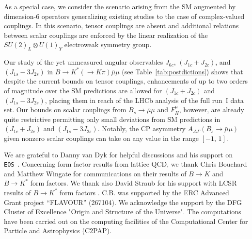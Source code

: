\documentclass[twocolumn,epjc3]{svjour3}
\numberwithin{equation}{section}
\def \reftab#1{Table~\ref{#1}}
\renewcommand{\[}{\big[}
\renewcommand{\]}{\big]}
\renewcommand{\(}{\big(}
\renewcommand{\)}{\big)}
\def \eos{\texttt{EOS}}
\begin{document}
As a special case, we consider the scenario arising from the SM
augmented by dimension-6 operators generalizing existing studies to
the case of complex-valued couplings. In this scenario, tensor
couplings are absent and additional relations between scalar couplings
are enforced by the linear realization of the $SU(2)_L \otimes U(1)_Y$
electroweak symmetry group.

Our study of the {yet unmeasured} angular observables $J_{6c}$,
$(J_{1c} + J_{2c})$, and $(J_{1s} - 3 J_{2s})$ in $B\to K^* (\to K\pi)
\bar\mu\mu$ (see \reftab{tab:postdictions}) shows that despite the
current bounds on tensor couplings, enhancements of up to two orders
of magnitude over the SM predictions are allowed for $(J_{1c} +
J_{2c})$ and $(J_{1s} - 3 J_{2s})$, placing them in reach of the LHCb
analysis of the full run~I data set. Our bounds on scalar couplings
from $B_s\to \bar\mu\mu$ and $F_H^\mu$, however, are already quite
restrictive permitting only small deviations from SM predictions in
$(J_{1c} + J_{2c})$ and $(J_{1s} - 3 J_{2s})$. Notably, the CP
asymmetry $A_{\Delta\Gamma}(B_s\to \bar\mu\mu)$ given nonzero scalar
couplings can take on any value in the range $[-1,\, 1]$.

%
%
%
\begin{acknowledgements}
  We are grateful to Danny van Dyk for helpful discussions and his support on
  \eos~\cite{EOS}. Concerning form factor results from lattice QCD, we thank
  Chris Bouchard and Matthew Wingate for communications on their results of
  $B\to K$ \cite{Bouchard:2013eph} and $B\to K^*$ \cite{Horgan:2015vla} form
  factors. We thank also David Straub for his support with LCSR results of $B\to
  K^*$ form factors \cite{Straub:2015ica}.  C.B. was supported by the ERC
  Advanced Grant project ``FLAVOUR'' (267104). We acknowledge the support by the
  DFG Cluster of Excellence "Origin and Structure of the Universe". The
  computations have been carried out on the computing facilities of the
  Computational Center for Particle and Astrophysics (C2PAP).
\end{acknowledgements}


%
%

\appendix

%
%
%
\end{document}
